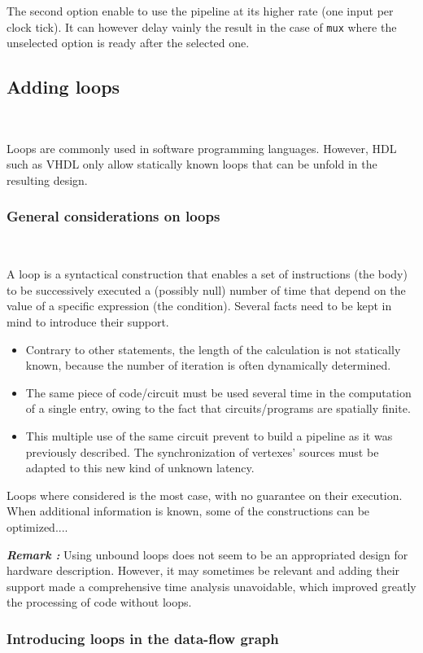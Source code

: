 \documentclass[10pt,a4paper]{article}
\newcommand{\code}{\texttt}
\renewcommand{\indent}{~\\\vspace{-.8cm}}
\begin{document}
The second option enable to use the pipeline at its higher rate (one input per clock tick). It can however delay vainly the result in the case of \code{mux} where the unselected option is ready after the selected one.


\subsection{Adding loops}
\indent

Loops are commonly used in software programming languages. However, HDL such as VHDL only allow statically known loops that can be unfold in the resulting design.

\subsubsection{General considerations on loops}\indent

A loop is a syntactical construction that enables a set of instructions (the body) to be successively executed a (possibly null) number of time that depend on the value of a specific expression (the condition). Several facts need to be kept in mind to introduce their support.
\begin{itemize}
	\item Contrary to other statements, the length of the calculation is not statically known, because the number of iteration is often dynamically determined.
	\item The same piece of code/circuit must be used several time in the computation of a single entry, owing to the fact that circuits/programs are spatially finite.
	\item This multiple use of the same circuit prevent to build a pipeline as it was previously described. The synchronization of vertexes' sources must be adapted to this new kind of unknown latency.
\end{itemize}

Loops where considered is the most case, with no guarantee on their execution. When additional information is known, some of the constructions can be optimized....


\textbf{\textsl{Remark :}} Using unbound loops does not seem to be an appropriated design for hardware description. However, it may sometimes be relevant and adding their support made a comprehensive time analysis unavoidable, which improved greatly the processing of code without loops.


\subsubsection{Introducing loops in the data-flow graph} \indent
\end{document}
